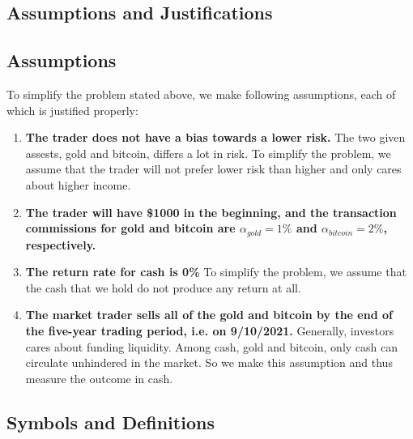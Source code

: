 \documentclass[12pt,a4paper]{article}
\begin{document}
\begin{spacing}{1.2}
\section{Assumptions and Justifications}
\label{Assumptions_Justifications}

\subsection{Assumptions}
To simplify the problem stated above, we make following assumptions, each of which is justified properly: 
\begin{enumerate}
	
	\item \textbf{The trader does not have a bias towards a lower risk.} The two given assests, gold and bitcoin, differs a lot in risk. To simplify the problem, we assume that the trader will not prefer lower risk than higher and only cares about higher income.
	
	\item \textbf{The trader will have \$1000 in the beginning, and the transaction commissions for gold and bitcoin are $\alpha_{gold}=1\%$ and $\alpha_{bitcoin}=2\%$, respectively.}

	\item \textbf{The return rate for cash is 0\%} To simplify the problem, we assume that the cash that we hold do not produce any return at all.

	\item \textbf{The market trader sells all of the gold and bitcoin by the end of the five-year trading period, i.e. on 9/10/2021.} Generally, investors cares about funding liquidity. Among cash, gold and bitcoin, only cash can circulate unhindered in the market. So we make this assumption and thus measure the outcome in cash.
	
\end{enumerate}


\subsection{Symbols and Definitions}


\end{spacing}
\end{document}
